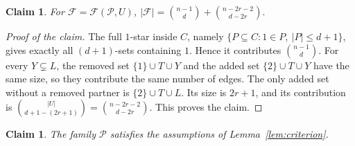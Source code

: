 \documentclass[11pt]{article}
\newtheorem{claim}[theorem]{Claim}
\theoremstyle{definition}
\newenvironment{poc}{\begin{proof}[Proof of the claim]\renewcommand*{\qedsymbol}{$\blacksquare$}}{\end{proof}}
\newcommand{\cP}{\mathcal{P}}
\newcommand{\cF}{\mathcal{F}}
\begin{document}
\begin{claim}\label{claim:main-count}
For \(\cF=\cF(\cP,U)\),
\(
|\cF|=\binom{n-1}{d}+\binom{n-2r-2}{d-2r}.
\)
\end{claim}

\begin{poc}
The full \(1\)-star inside \(C\), namely \(\{P\subseteq C:1\in P,\ |P|\le d+1\}\), gives exactly all \((d+1)\)-sets containing \(1\). Hence it contributes \(\binom{n-1}{d}\). For every \(Y\subsetneq L\), the removed set \(\{1\}\cup T\cup Y\) and the added set \(\{2\}\cup T\cup Y\) have the same size, so they contribute the same number of edges. The only added set without a removed partner is \(\{2\}\cup T\cup L\). Its size is \(2r+1\), and its contribution is \(\binom{|U|}{d+1-(2r+1)}=\binom{n-2r-2}{d-2r}.\)
This proves the claim.
\end{poc}

\begin{claim}\label{claim:main-certificate}
The family \(\cP\) satisfies the assumptions of Lemma~\ref{lem:criterion}.
\end{claim}
\end{document}
